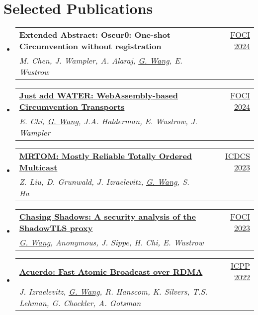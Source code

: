 \documentclass[letterpaper,11pt]{article}
\makeatletter
\newcommand{\resumeSubheading}[4]{
  \vspace{-2pt}\item
    \begin{tabular*}{0.97\textwidth}[t]{l@{\extracolsep{\fill}}r}
      \textbf{#1} & #2 \\
      \textit{\small#3} & \textit{\small #4} \\
    \end{tabular*}\vspace{-7pt}
}
\newcommand{\resumeSubHeadingListStart}{\begin{itemize}[leftmargin=0.15in, label={}]}
\newcommand{\resumeSubHeadingListEnd}{\end{itemize}}
\makeatother
\begin{document}
\section{Selected Publications}
\resumeSubHeadingListStart
  \resumeSubheading
  {\textbf{Extended Abstract: Oscur0: One-shot Circumvention without registration}}{\href{https://foci.community/foci24.html}{FOCI 2024}}
  {M. Chen, J. Wampler, A. Alaraj, \underline{G. Wang}, E. Wustrow}{}
  \resumeSubheading
  {\href{https://arxiv.org/abs/2312.00163}{\textbf{Just add {WATER}: {WebAssembly}-based Circumvention Transports}}}{\href{https://foci.community/foci24.html}{FOCI 2024}}
  {E. Chi, \underline{G. Wang}, J.A. Halderman, E. Wustrow, J. Wampler}{}
  \resumeSubheading
  {\href{https://ieeexplore.ieee.org/document/10272412}{\textbf{{MRTOM}: Mostly Reliable Totally Ordered Multicast}}}{\href{https://icdcs2023.icdcs.org/}{ICDCS 2023}}
  {Z. Liu, D. Grunwald, J. Izraelevitz, \underline{G. Wang}, S. Ha}{}
  \resumeSubheading
  {\href{https://www.petsymposium.org/foci/2023/foci-2023-0002.php}{\textbf{{Chasing Shadows}: A security analysis of the {ShadowTLS} proxy}}}{\href{https://foci.community/foci23.html}{FOCI 2023}}
  {\underline{G. Wang}, Anonymous, J. Sippe, H. Chi, E. Wustrow}{}
  \resumeSubheading
  {\href{https://dl.acm.org/doi/abs/10.1145/3545008.3545041}{\textbf{Acuerdo: Fast Atomic Broadcast over {RDMA}}}}{\href{https://icpp22.gitlabpages.inria.fr/}{ICPP 2022}}
  {J. Izraelevitz, \underline{G. Wang}, R. Hanscom, K. Silvers, T.S. Lehman, G. Chockler, A. Gotsman}{}
\resumeSubHeadingListEnd
\vspace{1pt}

\end{document}
